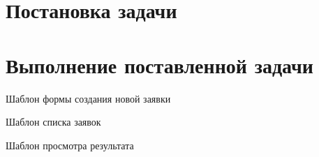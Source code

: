 


\setcounter{page}{2}
\def\contentsname{СОДЕРЖАНИЕ\vspace{10mm}}
\tableofcontents
\clearpage


\chapter{Постановка задачи}







\chapter{Выполнение поставленной задачи}








\lstset{ %
  language=HTML,
  basicstyle=\scriptsize
}
\centerline{Шаблон формы создания новой заявки}


\centerline{Шаблон списка заявок}


\centerline{Шаблон просмотра результата}



